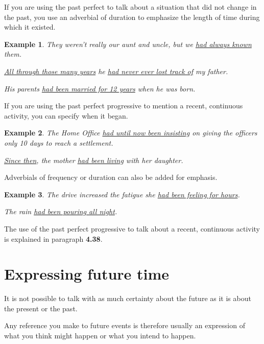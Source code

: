 \documentclass[oneside]{book}
\numberwithin{equation}{section}
\newtheorem{example}{Example}[section]
\begin{document}
%
\noindent{} If you are using the past perfect to talk about a situation that did not change in the past, you use an adverbial of duration to emphasize the length of time during which it existed.
\begin{example}
    They weren't really our aunt and uncle, but we \underline{had always known} them.
    
    \underline{All through those many years} he \underline{had never ever lost track of} my father.
    
    His parents \underline{had been married for 12 years} when he was born.
\end{example}
%
\noindent{} If you are using the past perfect progressive to mention a recent, continuous activity, you can specify when it began.
\begin{example}
    The Home Office \underline{had until now been insisting} on giving the officers only 10 days to reach a settlement.
    
    \underline{Since then}, the mother \underline{had been living} with her daughter.
\end{example}
Adverbials of frequency or duration can also be added for emphasis.
\begin{example}
    The drive increased the fatigue she \underline{had been feeling for hours}.
    
    The rain \underline{had been pouring all night}.
\end{example}
The use of the past perfect progressive to talk about a recent, continuous activity is explained in paragraph \textbf{4.38}.

\section{Expressing future time}
\noindent{} It is not possible to talk with as much certainty about the future as it is about the present or the past.

Any reference you make to future events is therefore usually an expression of what you think might happen or what you intend to happen.
\end{document}
